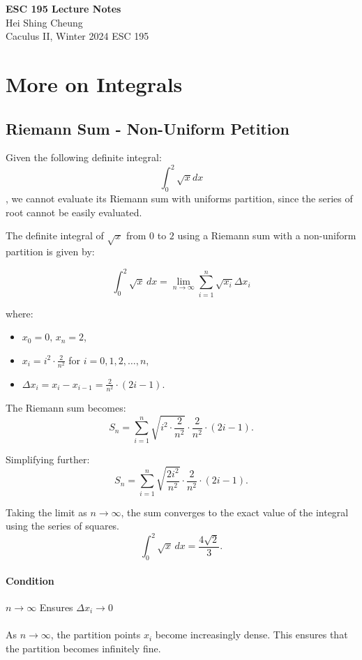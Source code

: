 \documentclass[11pt]{article}
\begin{document}
\thispagestyle{empty}
{\LARGE \bf ESC 195 Lecture Notes}\\
{\large Hei Shing Cheung}\\
Caculus II, Winter 2024 \hfill ESC 195\\
\section{More on Integrals}
\subsection{Riemann Sum - Non-Uniform Petition}
\begin{example}
    Given the following definite integral:
    $$\int^2_0 \sqrt{x} dx$$, we cannot evaluate its Riemann sum with uniforms partition, since the series of root cannot be easily evaluated. 
\end{example}

The definite integral of $\sqrt{x}$ from $0$ to $2$ using a Riemann sum with a non-uniform partition is given by:

$$
\int_{0}^{2} \sqrt{x} \, dx = \lim_{n \to \infty} \sum_{i=1}^n \sqrt{x_i} \Delta x_i
$$

where:
\begin{itemize}
    \item $x_0 = 0, \, x_n = 2$,
    \item $x_i = i^2 \cdot \frac{2}{n^2}$ for $i = 0, 1, 2, \dots, n$,
    \item $\Delta x_i = x_i - x_{i-1} = \frac{2}{n^2} \cdot (2i - 1)$.
\end{itemize}

The Riemann sum becomes:
$$
S_n = \sum_{i=1}^n \sqrt{i^2 \cdot \frac{2}{n^2}} \cdot \frac{2}{n^2} \cdot (2i - 1).
$$

Simplifying further:
$$
S_n = \sum_{i=1}^n \sqrt{\frac{2i^2}{n^2}} \cdot \frac{2}{n^2} \cdot (2i - 1).
$$

Taking the limit as $n \to \infty$, the sum converges to the exact value of the integral using the series of squares. 
$$
\int_{0}^{2} \sqrt{x} \, dx = \frac{4\sqrt{2}}{3}.
$$
\paragraph{Condition} $n \to \infty$ Ensures $\Delta x_i \to 0$
\paragraph{} As $n \to \infty$, the partition points $x_i$ become increasingly dense. This ensures that the partition becomes infinitely fine.
\end{document}
